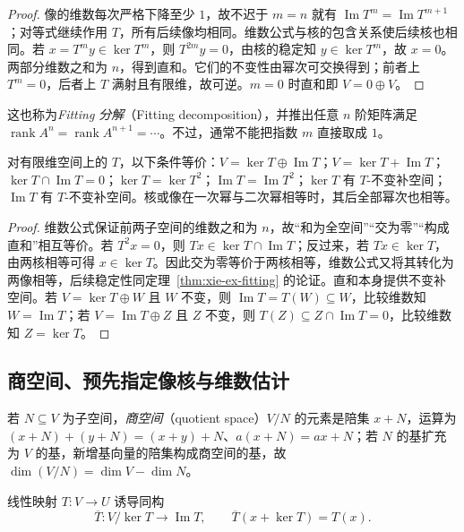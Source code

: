 \begin{proof}
像的维数每次严格下降至少 $1$，故不迟于 $m=n$ 就有 $\operatorname{Im}T^m=\operatorname{Im}T^{m+1}$；对等式继续作用 $T$，所有后续像均相同。维数公式与核的包含关系使后续核也相同。若 $x=T^my\in\ker T^m$，则 $T^{2m}y=0$，由核的稳定知 $y\in\ker T^m$，故 $x=0$。两部分维数之和为 $n$，得到直和。它们的不变性由幂次可交换得到；前者上 $T^m=0$，后者上 $T$ 满射且有限维，故可逆。$m=0$ 时直和即 $V=0\oplus V$。
\end{proof}

这也称为\emph{Fitting 分解}（Fitting decomposition），并推出任意 $n$ 阶矩阵满足 $\operatorname{rank}A^n=\operatorname{rank}A^{n+1}=\cdots$。不过，通常不能把指数 $m$ 直接取成 $1$。

\begin{proposition}
\label{prop:xie-ex-first-power-splitting}
对有限维空间上的 $T$，以下条件等价：$V=\ker T\oplus\operatorname{Im}T$；$V=\ker T+\operatorname{Im}T$；$\ker T\cap\operatorname{Im}T=0$；$\ker T=\ker T^2$；$\operatorname{Im}T=\operatorname{Im}T^2$；$\ker T$ 有 $T$-不变补空间；$\operatorname{Im}T$ 有 $T$-不变补空间。核或像在一次幂与二次幂相等时，其后全部幂次也相等。
\end{proposition}

\begin{proof}
维数公式保证前两子空间的维数之和为 $n$，故“和为全空间”“交为零”“构成直和”相互等价。若 $T^2x=0$，则 $Tx\in\ker T\cap\operatorname{Im}T$；反过来，若 $Tx\in\ker T$，由两核相等可得 $x\in\ker T$。因此交为零等价于两核相等，维数公式又将其转化为两像相等，后续稳定性同定理~\ref{thm:xie-ex-fitting} 的论证。直和本身提供不变补空间。若 $V=\ker T\oplus W$ 且 $W$ 不变，则 $\operatorname{Im}T=T(W)\subseteq W$，比较维数知 $W=\operatorname{Im}T$；若 $V=\operatorname{Im}T\oplus Z$ 且 $Z$ 不变，则 $T(Z)\subseteq Z\cap\operatorname{Im}T=0$，比较维数知 $Z=\ker T$。
\end{proof}

\subsection{商空间、预先指定像核与维数估计}

若 $N\subseteq V$ 为子空间，\emph{商空间}（quotient space）$V/N$ 的元素是陪集 $x+N$，运算为 $(x+N)+(y+N)=(x+y)+N$、$a(x+N)=ax+N$；若 $N$ 的基扩充为 $V$ 的基，新增基向量的陪集构成商空间的基，故 $\dim(V/N)=\dim V-\dim N$。

\begin{theorem}
\label{thm:xie-ex-first-isomorphism}
线性映射 $T:V\to U$ 诱导同构
\[
    \overline T:V/\ker T\longrightarrow\operatorname{Im}T,
    \qquad \overline T(x+\ker T)=T(x).
\]
\end{theorem}

